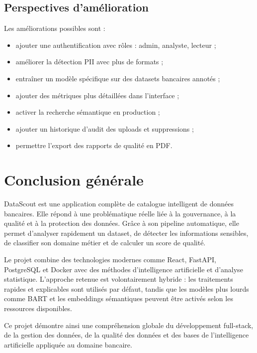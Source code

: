 \documentclass[12pt,a4paper]{report}
\begin{document}
\section{Perspectives d'amélioration}

Les améliorations possibles sont :

\begin{itemize}
    \item ajouter une authentification avec rôles : admin, analyste, lecteur ;
    \item améliorer la détection PII avec plus de formats ;
    \item entraîner un modèle spécifique sur des datasets bancaires annotés ;
    \item ajouter des métriques plus détaillées dans l'interface ;
    \item activer la recherche sémantique en production ;
    \item ajouter un historique d'audit des uploads et suppressions ;
    \item permettre l'export des rapports de qualité en PDF.
\end{itemize}

\chapter*{Conclusion générale}

DataScout est une application complète de catalogue intelligent de données bancaires. Elle répond à une problématique réelle liée à la gouvernance, à la qualité et à la protection des données. Grâce à son pipeline automatique, elle permet d'analyser rapidement un dataset, de détecter les informations sensibles, de classifier son domaine métier et de calculer un score de qualité.

Le projet combine des technologies modernes comme React, FastAPI, PostgreSQL et Docker avec des méthodes d'intelligence artificielle et d'analyse statistique. L'approche retenue est volontairement hybride : les traitements rapides et explicables sont utilisés par défaut, tandis que les modèles plus lourds comme BART et les embeddings sémantiques peuvent être activés selon les ressources disponibles.

Ce projet démontre ainsi une compréhension globale du développement full-stack, de la gestion des données, de la qualité des données et des bases de l'intelligence artificielle appliquée au domaine bancaire.
\end{document}
